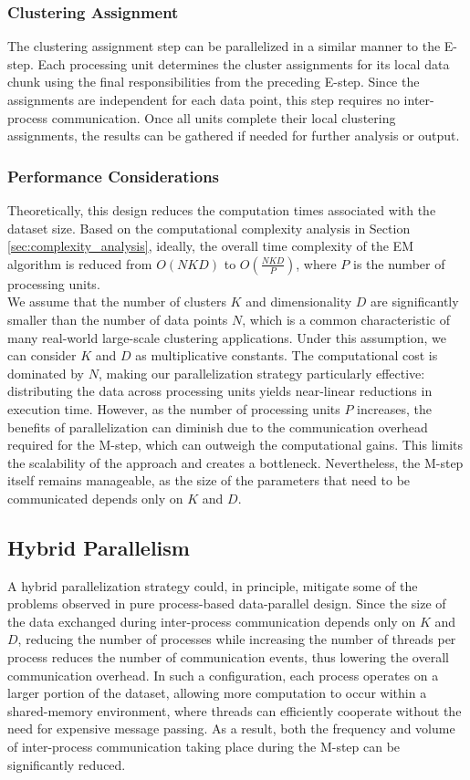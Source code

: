 \subsubsection*{Clustering Assignment}
The clustering assignment step can be parallelized in a similar manner to the E-step.
Each processing unit determines the cluster assignments for its local data chunk using the final responsibilities from the preceding E-step.
Since the assignments are independent for each data point, this step requires no inter-process communication.
Once all units complete their local clustering assignments, the results can be gathered if needed for further analysis or output.

\subsubsection*{Performance Considerations}
Theoretically, this design reduces the computation times associated with the dataset size. Based on the computational complexity analysis in Section \ref{sec:complexity_analysis}, ideally, the overall time complexity of the EM algorithm is reduced from $O(NKD)$ to $O\left(\frac{NKD}{P}\right)$, where $P$ is the number of processing units.
\\We assume that the number of clusters $K$ and dimensionality $D$ are significantly smaller than the number of data points $N$, which is a common characteristic of many real-world large-scale clustering applications.
Under this assumption, we can consider $K$ and $D$ as multiplicative constants. The computational cost is dominated by $N$, making our parallelization strategy particularly effective: distributing the data across processing units yields near-linear reductions in execution time.
However, as the number of processing units $P$ increases, the benefits of parallelization can diminish due to the communication overhead required for the M-step, which can outweigh the computational gains.
This limits the scalability of the approach and creates a bottleneck.
Nevertheless, the M-step itself remains manageable, as the size of the parameters that need to be communicated depends only on $K$ and $D$.

\subsection{Hybrid Parallelism}
A hybrid parallelization strategy could, in principle, mitigate some of the problems observed in pure process-based data-parallel design.
Since the size of the data exchanged during inter-process communication depends only on $K$ and $D$, reducing the number of processes while increasing the number of threads per process reduces the number of communication events, thus lowering the overall communication overhead.
In such a configuration, each process operates on a larger portion of the dataset, allowing more computation to occur within a shared-memory environment, where threads can efficiently cooperate without the need for expensive message passing.
As a result, both the frequency and volume of inter-process communication taking place during the M-step can be significantly reduced.
